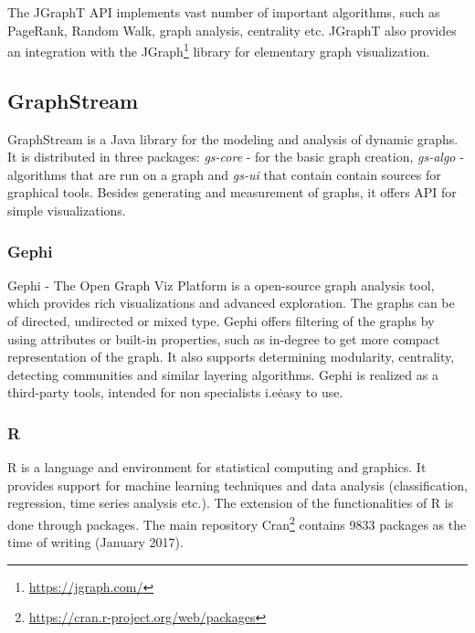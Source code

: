 The JGraphT API implements vast number of important algorithms, such as PageRank, Random Walk, graph analysis, centrality etc.
JGraphT also provides an integration with the JGraph\footnote{\url{https://jgraph.com/}} library for elementary graph visualization.

\subsection{GraphStream}

GraphStream is a Java library for the modeling and analysis of dynamic graphs\cite{GraphStream}. 
It is distributed in three packages: \emph{gs-core} - for the basic graph creation, 
\emph{gs-algo} - algorithms that are run on a graph  and
\emph{gs-ui} that contain contain sources for graphical tools.
Besides generating and measurement of graphs, it offers API for simple visualizations. 

\subsubsection{Gephi}

Gephi - The Open Graph Viz Platform is a open-source graph analysis tool, 
which provides rich visualizations and advanced exploration\cite{Gephi}.
The graphs can be of directed, undirected or mixed type\cite{Gephi:GraphAPI}.
Gephi offers filtering of the graphs by using attributes or built-in properties, 
such as in-degree to get more compact representation of the graph. 
It also supports determining modularity, centrality, detecting communities and similar layering algorithms.
Gephi is realized as a third-party tools, intended for non specialists i.e\. easy to use.

\subsubsection{R}

R is a language and environment for statistical computing and graphics\cite{R-project}.
It provides support for machine learning techniques and data analysis (classification, regression, time series analysis etc.).
The extension of the functionalities of R is done through packages.
The main repository Cran\footnote{\url{https://cran.r-project.org/web/packages}} 
contains 9833 packages as the time of writing (January 2017).

